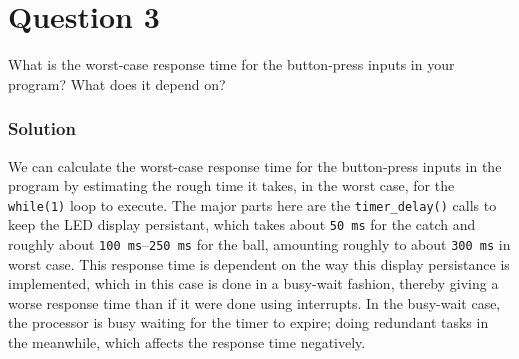 \section*{Question 3}

What is the worst-case response time for the button-press inputs in your program?
What does it depend on?

\subsubsection*{Solution}

We can calculate the worst-case response time for the button-press inputs in the program by estimating the rough time it takes, in the worst case, for the \texttt{while\@(1)} loop to execute.
The major parts here are the \texttt{timer\_delay\@()} calls to keep the LED display persistant, which takes about \texttt{50\,\texttt{ms}} for the catch and roughly about \texttt{100\,\texttt{ms}}--\texttt{250\,\texttt{ms}} for the ball, amounting roughly to about \texttt{300\,\texttt{ms}} in worst case.
This response time is dependent on the way this display persistance is implemented, which in this case is done in a busy-wait fashion, thereby giving a worse response time than if it were done using interrupts.
In the busy-wait case, the processor is busy waiting for the timer to expire; doing redundant tasks in the meanwhile, which affects the response time negatively.
